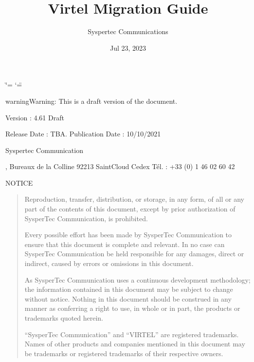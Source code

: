 \documentclass[letterpaper,10pt,english]{sphinxmanual}
\title{Virtel Migration Guide}
\date{Jul 23, 2023}
\author{Syspertec Communications}
\begin{document}
\ifdefined\shorthandoff
  \ifnum\catcode`\=\string=\active\shorthandoff{=}\fi
  \ifnum\catcode`\"=\active{}\fi
\fi

\pagestyle{empty}
\sphinxmaketitle
\pagestyle{plain}
\sphinxtableofcontents
\pagestyle{normal}
\label{\detokenize{Migration_Guide::doc}}


\sphinxAtStartPar
{}

\begin{sphinxadmonition}{warning}{Warning:}
\sphinxAtStartPar
This is a draft version of the document.
\end{sphinxadmonition}

\sphinxAtStartPar
Version : 4.61 Draft

\sphinxAtStartPar
Release Date : TBA. Publication Date : 10/10/2021

\sphinxAtStartPar
Syspertec Communication

, Bureaux de la Colline 92213 Saint\sphinxhyphen{}Cloud Cedex Tél. : +33 (0) 1 46 02 60 42

\sphinxAtStartPar
{}

\sphinxAtStartPar
NOTICE
\begin{quote}

\sphinxAtStartPar
Reproduction, transfer, distribution, or storage, in any form, of all or any part of
the contents of this document, except by prior authorization of SysperTec
Communication, is prohibited.

\sphinxAtStartPar
Every possible effort has been made by SysperTec Communication to ensure that this document
is complete and relevant. In no case can SysperTec Communication be held responsible for
any damages, direct or indirect, caused by errors or omissions in this document.

\sphinxAtStartPar
As SysperTec Communication uses a continuous development methodology; the information
contained in this document may be subject to change without notice. Nothing in this
document should be construed in any manner as conferring a right to use, in whole or in
part, the products or trademarks quoted herein.

\sphinxAtStartPar
“SysperTec Communication” and “VIRTEL” are registered trademarks. Names of other products
and companies mentioned in this document may be trademarks or registered trademarks of
their respective owners.
\end{quote}
\end{document}
